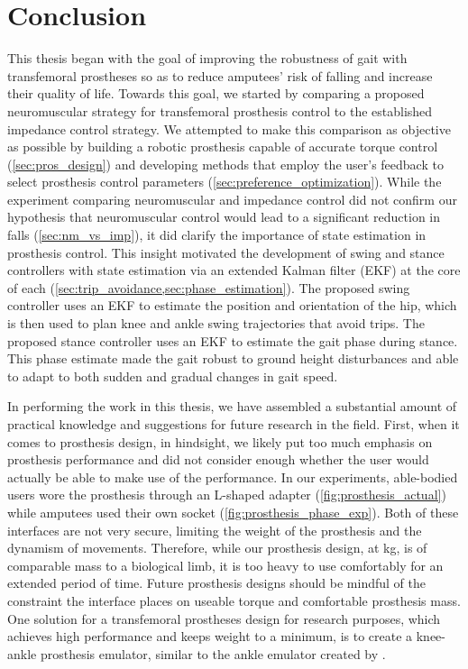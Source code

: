 \chapter{Conclusion}\label{sec:thesis_conclusion}

This thesis began with the goal of improving the robustness of gait with
transfemoral prostheses so as to reduce amputees' risk of falling and increase
their quality of life. Towards this goal, we started by comparing a proposed
neuromuscular strategy for transfemoral prosthesis control to the established
impedance control strategy. We attempted to make this comparison as objective as
possible by building a robotic prosthesis capable of accurate torque control
(\cref{sec:pros_design}) and developing methods that employ the user's feedback
to select prosthesis control parameters (\cref{sec:preference_optimization}).
While the experiment comparing neuromuscular and impedance control did not
confirm our hypothesis that neuromuscular control would lead to a significant
reduction in falls (\cref{sec:nm_vs_imp}), it did clarify the importance of
state estimation in prosthesis control. This insight motivated the development
of swing and stance controllers with state estimation via an extended Kalman
filter (EKF) at the core of each
(\cref{sec:trip_avoidance,sec:phase_estimation}). The proposed swing controller
uses an EKF to estimate the position and orientation of the hip, which is then
used to plan knee and ankle swing trajectories that avoid trips. The proposed
stance controller uses an EKF to estimate the gait phase during stance. This
phase estimate made the gait robust to ground height disturbances and able to
adapt to both sudden and gradual changes in gait speed. 

In performing the work in this thesis, we have assembled a substantial amount of
practical knowledge and suggestions for future research in the field. First,
when it comes to prosthesis design, in hindsight, we likely put too much
emphasis on prosthesis performance and did not consider enough whether the user
would actually be able to make use of the performance. In our experiments,
able-bodied users wore the prosthesis through an L-shaped adapter
(\cref{fig:prosthesis_actual}) while amputees used their own socket
(\cref{fig:prosthesis_phase_exp}). Both of these interfaces are not very secure,
limiting the weight of the prosthesis and the dynamism of movements. Therefore,
while our prosthesis design, at \unit[6]{kg}, is of comparable mass to a
biological limb, it is too heavy to use comfortably for an extended period of
time. Future prosthesis designs should be mindful of the constraint the
interface places on useable torque and comfortable prosthesis mass. One solution
for a transfemoral prostheses design for research purposes, which achieves high
performance and keeps weight to a minimum, is to create a knee-ankle prosthesis
emulator, similar to the ankle emulator created by
\citet{caputo2013experimental}.

